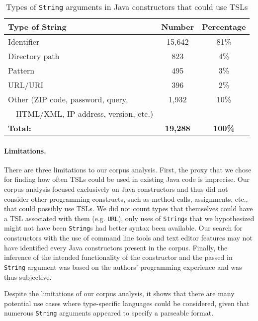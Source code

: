 \begin{table}
   \centering
       \caption{Types of \lstinline{String} arguments in Java constructors that could use TSLs}
       \vspace{10pt}
    \begin{tabular}[t]{l | c | c}
    \bf Type of String & \bf Number & \bf Percentage \\ \hline
    Identifier & 15,642 & 81\% \\
    Directory path& 823 & 4\% \\
    Pattern & 495 & 3\% \\
    URL/URI & 396 & 2\% \\
    Other (ZIP code, password, query, & 1,932 & 10\% \\
    ~~HTML/XML, IP address, version, etc.)  & & \\ \hline
    \bf Total: & \bf 19,288 & \bf 100\%
    \end{tabular}
    \label{strings-in-constructors}
\end{table}

\paragraph{Limitations.} There are three limitations to our corpus analysis. First, the proxy that we chose for finding how often TSLs could be used in existing Java code is imprecise. Our corpus analysis focused exclusively on Java constructors and thus did not consider other programming constructs, such as method calls,  assignments, etc., that could possibly use TSLs. We did not count types that themselves could have a TSL associated with them (e.g. \lstinline{URL}), only uses of \lstinline{String}s that we hypothesized might not have been \lstinline{String}s had better syntax been available. Our search for constructors with the use of command line tools and text editor features may not have identified every Java constructors present in the corpus. Finally, the inference of the intended functionality of the constructor and the passed in \lstinline{String} argument was based on the authors' programming experience and was thus subjective.

\vspace{10px}

Despite the limitations of our corpus analysis, it shows that there are many potential use cases where type-specific languages could be considered, given that numerous \lstinline{String} arguments appeared to specify a parseable format.

